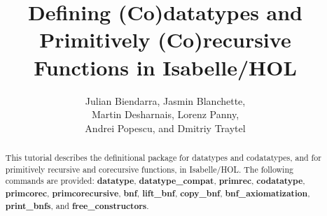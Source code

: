 \documentclass[12pt,a4paper]{article} %
\title{%
Defining (Co)datatypes and Primitively (Co)recursive Functions in Isabelle/HOL}
\author{Julian Biendarra, Jasmin Blanchette, \\
Martin Desharnais, Lorenz Panny, \\
Andrei Popescu, and Dmitriy Traytel}
\renewcommand\_{\hbox{\textunderscore\kern-.05ex}}
\newcommand{\keyw}[1]{\textbf{#1}}
\begin{document}
\maketitle

\begin{sloppy}
\begin{abstract}
\noindent
This tutorial describes the definitional package for datatypes and codatatypes,
and for primitively recursive and corecursive functions, in Isabelle/HOL. The
following commands are provided:
\keyw{datatype}, \keyw{datatype_\allowbreak compat}, \keyw{prim\-rec}, \keyw{co\-data\-type},
\keyw{prim\-co\-rec}, \keyw{prim\-co\-recursive}, \keyw{bnf}, \keyw{lift_\allowbreak bnf},
\keyw{copy_\allowbreak bnf}, \keyw{bnf_\allowbreak axiom\-atization},
\keyw{print_\allowbreak bnfs}, and \keyw{free_\allowbreak constructors}.
\end{abstract}
\end{sloppy}

\tableofcontents



\let\em=\sl
{}

\end{document}
